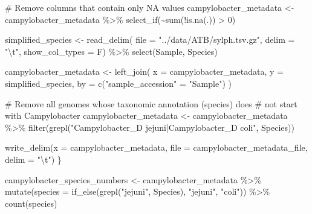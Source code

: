 \documentclass[
  twocolumn,
  landscape]{report}
\newenvironment{Shaded}{}{}
\newcommand{\AttributeTok}[1]{\textcolor[rgb]{0.84,0.23,0.29}{#1}}
\newcommand{\CommentTok}[1]{\textcolor[rgb]{0.42,0.45,0.49}{#1}}
\newcommand{\DecValTok}[1]{\textcolor[rgb]{0.00,0.36,0.77}{#1}}
\newcommand{\FunctionTok}[1]{\textcolor[rgb]{0.44,0.26,0.76}{#1}}
\newcommand{\NormalTok}[1]{\textcolor[rgb]{0.14,0.16,0.18}{#1}}
\newcommand{\OtherTok}[1]{\textcolor[rgb]{0.44,0.26,0.76}{#1}}
\newcommand{\SpecialCharTok}[1]{\textcolor[rgb]{0.00,0.36,0.77}{#1}}
\newcommand{\StringTok}[1]{\textcolor[rgb]{0.01,0.18,0.38}{#1}}
\begin{document}
\begin{Shaded}
\begin{Highlighting}[]
  \CommentTok{\# Remove columns that contain only NA values}
\NormalTok{  campylobacter\_metadata }\OtherTok{\textless{}{-}}\NormalTok{ campylobacter\_metadata }\SpecialCharTok{\%\textgreater{}\%}
    \FunctionTok{select\_if}\NormalTok{(}\SpecialCharTok{\textasciitilde{}}\FunctionTok{sum}\NormalTok{(}\SpecialCharTok{!}\FunctionTok{is.na}\NormalTok{(.)) }\SpecialCharTok{\textgreater{}} \DecValTok{0}\NormalTok{)}
  
\NormalTok{  simplified\_species }\OtherTok{\textless{}{-}} \FunctionTok{read\_delim}\NormalTok{(}
    \AttributeTok{file =} \StringTok{"../data/ATB/sylph.tsv.gz"}\NormalTok{,}
    \AttributeTok{delim =} \StringTok{"}\SpecialCharTok{\textbackslash{}t}\StringTok{"}\NormalTok{,}
    \AttributeTok{show\_col\_types =}\NormalTok{ F) }\SpecialCharTok{\%\textgreater{}\%}
    \FunctionTok{select}\NormalTok{(Sample, Species)}
  
\NormalTok{  campylobacter\_metadata }\OtherTok{\textless{}{-}} \FunctionTok{left\_join}\NormalTok{(}
    \AttributeTok{x =}\NormalTok{ campylobacter\_metadata,}
    \AttributeTok{y =}\NormalTok{ simplified\_species,}
    \AttributeTok{by =} \FunctionTok{c}\NormalTok{(}\StringTok{"sample\_accession"} \OtherTok{=} \StringTok{"Sample"}\NormalTok{)}
\NormalTok{  )}
  
  \CommentTok{\# Remove all genomes whose taxonomic annotation (species) does}
  \CommentTok{\# not start with \textquotesingle{}Campylobacter\textquotesingle{}}
\NormalTok{  campylobacter\_metadata }\OtherTok{\textless{}{-}}\NormalTok{ campylobacter\_metadata }\SpecialCharTok{\%\textgreater{}\%}
    \FunctionTok{filter}\NormalTok{(}\FunctionTok{grepl}\NormalTok{(}\StringTok{"Campylobacter\_D jejuni|Campylobacter\_D coli"}\NormalTok{, Species))}
  
  \FunctionTok{write\_delim}\NormalTok{(}\AttributeTok{x =}\NormalTok{ campylobacter\_metadata,}
              \AttributeTok{file =}\NormalTok{ campylobacter\_metadata\_file,}
              \AttributeTok{delim =} \StringTok{"}\SpecialCharTok{\textbackslash{}t}\StringTok{"}\NormalTok{)}
\NormalTok{\}}

\NormalTok{campylobacter\_species\_numbers }\OtherTok{\textless{}{-}}\NormalTok{ campylobacter\_metadata }\SpecialCharTok{\%\textgreater{}\%}
  \FunctionTok{mutate}\NormalTok{(}\AttributeTok{species =} \FunctionTok{if\_else}\NormalTok{(}\FunctionTok{grepl}\NormalTok{(}\StringTok{"jejuni"}\NormalTok{, Species), }\StringTok{"jejuni"}\NormalTok{, }\StringTok{"coli"}\NormalTok{)) }\SpecialCharTok{\%\textgreater{}\%}
  \FunctionTok{count}\NormalTok{(species)}


\end{Highlighting}
\end{Shaded}
\end{document}
